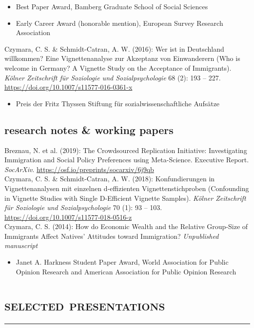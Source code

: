 \documentclass[11pt, a4paper]{article}
\newcommand{\years}[1]{\marginnote{~~#1}}
\begin{document}
\begin{itemize}
	\item Best Paper Award, Bamberg Graduate School of Social Sciences
	\item Early Career Award (honorable mention), European Survey Research Association
\end{itemize}
\years{1}Czymara, C. S. \& Schmidt-Catran, A. W. (2016): Wer ist in Deutschland willkommen? Eine Vignettenanalyse zur Akzeptanz von Einwanderern (Who is welcome in Germany? A Vignette Study on the Acceptance of Immigrants). \textit{K\"olner Zeitschrift f\"ur Soziologie und Sozialpsychologie} 68 (2): 193 -- 227. \href{https://doi.org/10.1007/s11577-016-0361-x}{https://doi.org/10.1007/s11577-016-0361-x}
\begin{itemize}
	\item Preis der Fritz Thyssen Stiftung für sozialwissenschaftliche Aufsätze
\end{itemize}

\hspace{1em}
\subsection*{research notes \& working papers}
\years{3}Breznau, N. et al. (2019): The Crowdsourced Replication Initiative: Investigating Immigration and Social Policy Preferences using Meta-Science. Executive Report. \textit{SocArXiv}. \href{https://osf.io/preprints/socarxiv/6j9qb}{https://osf.io/preprints/socarxiv/6j9qb}\\[1em]
\years{2}Czymara, C. S. \& Schmidt-Catran, A. W. (2018): Konfundierungen in Vignettenanalysen mit einzelnen d-effizienten Vignettenstichproben (Confounding in Vignette Studies with Single D-Efficient Vignette Samples). \textit{K\"olner Zeitschrift f\"ur Soziologie und Sozialpsychologie} 70 (1): 93 -- 103. \href{https://doi.org/10.1007/s11577-018-0516-z}{https://doi.org/10.1007/s11577-018-0516-z}\\[1em]
\years{1}Czymara, C. S. (2014): How do Economic Wealth and the Relative Group-Size of Immigrants Affect Natives' Attitudes toward Immigration? \textit{Unpublished manuscript}
\begin{itemize}
	\item Janet A. Harkness Student Paper Award, World Association for Public Opinion Research and American Association for Public Opinion Research
\end{itemize}
\section*{\textsc{selected presentations}}
\vskip-20pt{\noindent\rule{\textwidth}{1pt}}
\end{document}
